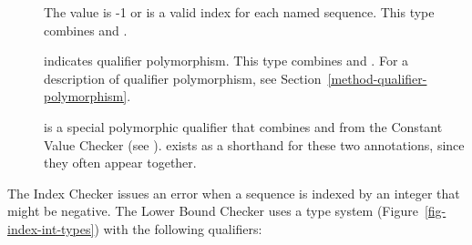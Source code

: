 \begin{description}
 \item[]
   The value is -1 or is a valid index for
   each named sequence.  This type combines
   and
  .

%
%

 \item[]
   indicates qualifier polymorphism.  This type combines
    and
   .
   For a description of qualifier polymorphism, see
   Section~\ref{method-qualifier-polymorphism}.

 \item[]
   is a special polymorphic qualifier that combines
    and
    from the
   Constant Value Checker (see ).
    exists
   as a shorthand for these two annotations, since
   they often appear together.

\end{description}


The Index Checker issues an error when
a sequence is indexed by an integer that might be negative.
The Lower Bound Checker uses a type system (Figure~\ref{fig-index-int-types}) with the following
qualifiers:


